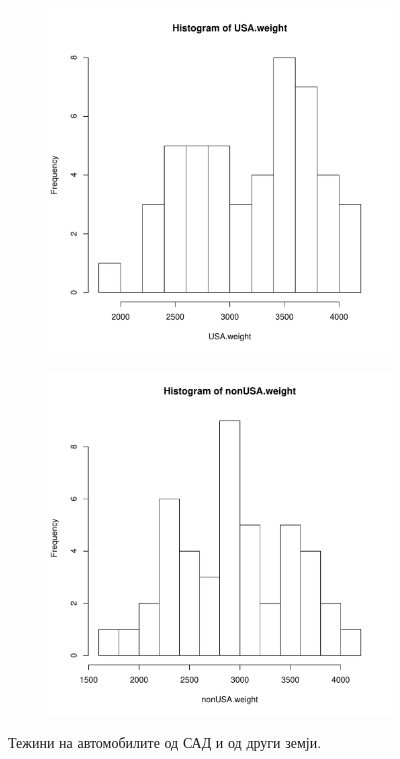 \documentclass[hyperref={unicode}, xcolor={svgnames, table},
usepdftitle=false]{beamer}
\theoremstyle{remark}
\begin{document}
\begin{frame}
  \begin{figure}
    \centering
    \begin{subfigure}[b]{.45\linewidth}
      \includegraphics[width=\textwidth]{Histogram_USA_Cars.pdf}
    \end{subfigure}
    \begin{subfigure}[b]{.45\linewidth}
      \includegraphics[width=\textwidth]{Histogram_non-USA_Cars.pdf}
    \end{subfigure}
    \caption{Тежини на автомобилите од САД и од други земји.}
  \end{figure}
\end{frame}
\end{document}
